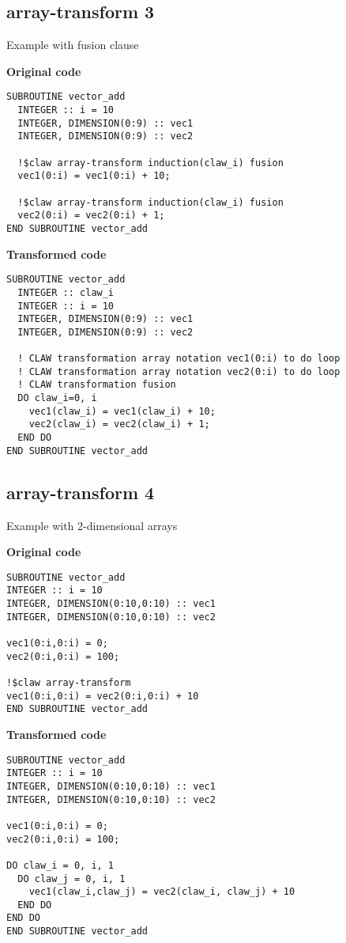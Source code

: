 \documentclass{article}
\begin{document}
\subsection{array-transform 3}
\label{array-transform3}
Example with fusion clause
 
\textbf{Original code}
\begin{lstlisting}
SUBROUTINE vector_add
  INTEGER :: i = 10
  INTEGER, DIMENSION(0:9) :: vec1
  INTEGER, DIMENSION(0:9) :: vec2

  !$claw array-transform induction(claw_i) fusion
  vec1(0:i) = vec1(0:i) + 10;

  !$claw array-transform induction(claw_i) fusion
  vec2(0:i) = vec2(0:i) + 1;
END SUBROUTINE vector_add
\end{lstlisting}


\textbf{Transformed code}
\begin{lstlisting}
SUBROUTINE vector_add
  INTEGER :: claw_i
  INTEGER :: i = 10
  INTEGER, DIMENSION(0:9) :: vec1
  INTEGER, DIMENSION(0:9) :: vec2

  ! CLAW transformation array notation vec1(0:i) to do loop
  ! CLAW transformation array notation vec2(0:i) to do loop
  ! CLAW transformation fusion
  DO claw_i=0, i
    vec1(claw_i) = vec1(claw_i) + 10;
    vec2(claw_i) = vec2(claw_i) + 1;
  END DO
END SUBROUTINE vector_add
\end{lstlisting}


\subsection{array-transform 4}
\label{array-transform4}
Example with 2-dimensional arrays

\textbf{Original code}
\begin{lstlisting}
SUBROUTINE vector_add
INTEGER :: i = 10
INTEGER, DIMENSION(0:10,0:10) :: vec1
INTEGER, DIMENSION(0:10,0:10) :: vec2

vec1(0:i,0:i) = 0;
vec2(0:i,0:i) = 100;

!$claw array-transform
vec1(0:i,0:i) = vec2(0:i,0:i) + 10
END SUBROUTINE vector_add
\end{lstlisting}

\textbf{Transformed code}
\begin{lstlisting}
SUBROUTINE vector_add
INTEGER :: i = 10
INTEGER, DIMENSION(0:10,0:10) :: vec1
INTEGER, DIMENSION(0:10,0:10) :: vec2

vec1(0:i,0:i) = 0;
vec2(0:i,0:i) = 100;

DO claw_i = 0, i, 1
  DO claw_j = 0, i, 1
    vec1(claw_i,claw_j) = vec2(claw_i, claw_j) + 10    
  END DO
END DO
END SUBROUTINE vector_add
\end{lstlisting}
\end{document}

